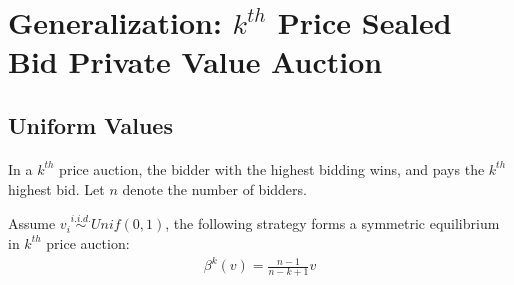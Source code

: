 \documentclass{article}
\begin{document}
	\section{Generalization: $k^{th}$ Price Sealed Bid Private Value Auction}
	\subsection{Uniform Values}
	\paragraph{} In a $k^{th}$ price auction, the bidder with the highest bidding wins, and pays the $k^{th}$ highest bid. Let $n$ denote the number of bidders.
	\begin{proposition}
		Assume $v_i \overset{i.i.d.}{\sim} Unif(0, 1)$, the following strategy forms a symmetric equilibrium in $k^{th}$ price auction:
		\begin{align}
			\beta^{k}(v) = \frac{n-1}{n-k+1}v 
		\end{align}
	\end{proposition}
	
\end{document}
